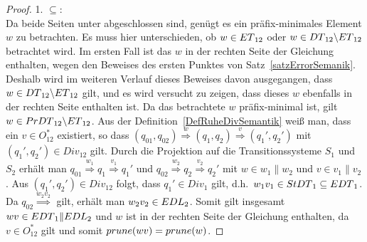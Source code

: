 \begin{proof}

  1. \glqq{}$\subseteq$\grqq{}:\\
  Da beide Seiten unter \cont{} abgeschlossen sind, genügt es ein
  präfix-minimales Element $w$ zu betrachten. Es muss hier unterschieden, ob
  $w\in ET{}_{12}$ oder $w\in DT{}_{12}\backslash ET{}_{12}$ betrachtet
  wird. Im ersten Fall ist das $w$ in der rechten Seite der Gleichung
  enthalten, wegen den Beweises des ersten Punktes von
  Satz~\ref{satzErrorSemanik}. Deshalb wird im weiteren Verlauf dieses Beweises
  davon ausgegangen, dass $w\in DT{}_{12}\backslash ET{}_{12}$ gilt, und es
  wird versucht zu zeigen, dass dieses $w$ ebenfalls in der rechten Seite
  enthalten ist. Da das betrachtete $w$ präfix-minimal ist, gilt $w\in
  PrDT{}_{12}\backslash ET{}_{12}$. Aus der
  Definition~\ref{DefRuheDivSemantik} weiß man, dass ein $v\in O^*_{12}$
  existiert, so dass $(q_{01},q_{02}) \overset{w}{\Rightarrow} (q_1,q_2)
  \overset{v}{\Rightarrow} (q_1',q_2')$ mit $(q_1',q_2')\in Div_{12}$ gilt.
  Durch die Projektion auf die Transitionssysteme $S_1$ und $S_2$ erhält man
  $q_{01} \overset{w_1}{\Rightarrow} q_1 \overset{v_1}{\Rightarrow} q_1'$ und
  $q_{02} \overset{w_2}{\Rightarrow} q_2 \overset{v_2}{\Rightarrow} q_2'$ mit
  $w\in w_1\|w_2$ und $v\in v_1\|v_2$. Aus $(q_1',q_2')\in Div_{12}$ folgt,
  dass \oBdA{} $q_1'\in Div_1$ gilt, d.h.\ $w_1v_1\in StDT{}_1\subseteq
  EDT{}_1$. Da $q_{02} \overset{w_2v_2}{\Rightarrow}$ gilt, erhält man
  $w_2v_2\in EDL_2$. Somit gilt insgesamt $wv\in EDT{}_1\|EDL{}_2$ und $w$
  ist in der rechten Seite der Gleichung enthalten, da $v\in O_{12}^*$ gilt und
  somit $prune{}(wv)=prune{}(w)$.


\end{proof}
